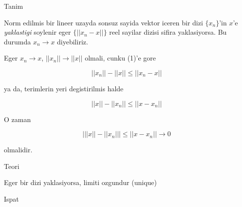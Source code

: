 \documentclass[12pt,fleqn]{article}\usepackage{../common}
\begin{document}
Tanim 

Norm edilmis bir lineer uzayda sonsuz sayida vektor iceren bir dizi
$\{x_n\}$'in $x$'e {\em yaklastigi} soylenir eger $\{||x_n-x||\}$ reel
sayilar dizisi sifira yaklasiyorsa. Bu durumda $x_n \to x$ diyebiliriz.

Eger $x_n \to x$, $||x_n|| \to ||x||$ olmali, cunku (1)'e gore 

\[ ||x_n||  - ||x|| \le ||x_n-x|| \]

ya da, terimlerin yeri degistirilmis halde

\[ ||x||  - ||x_n|| \le ||x-x_n|| \]

O zaman 

\[ \bigg| ||x||  - ||x_n|| \bigg|  \le ||x-x_n|| \to 0\]

olmalidir. 

Teori 

Eger bir dizi yaklasiyorsa, limiti ozgundur (unique)

Ispat
\end{document}
